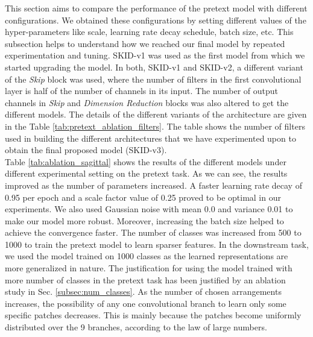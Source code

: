 \documentclass[journal]{IEEEtai}
\begin{document}
\indent This section aims to compare the performance of the pretext model with different configurations. We obtained these configurations by setting different values of the hyper-parameters like scale, learning rate decay schedule, batch size, etc. This subsection helps to understand how we reached our final model by repeated experimentation and tuning. SKID-v1 was used as the first model from which we started upgrading the model. In both, SKID-v1 and SKID-v2, a different variant of the \textit{Skip} block was used, where the number of filters in the first convolutional layer is half of the number of channels in its input. The number of output channels in \textit{Skip} and \textit{Dimension Reduction} blocks was also altered to get the different models. The details of the different variants of the architecture are given in the Table \ref{tab:pretext_ablation_filters}. The table shows the number of filters used in building the different architectures that we have experimented upon to obtain the final proposed model (SKID-v3).\\
\indent Table \ref{tab:ablation_sagittal} shows the results of the different models under different experimental setting on the pretext task. As we can see, the results improved as the number of parameters increased. A faster learning rate decay of 0.95 per epoch and a scale factor value of 0.25 proved to be optimal in our experiments. We also used Gaussian noise with mean 0.0 and variance 0.01 to make our model more robust. Moreover, increasing the batch size helped to achieve the convergence faster. The number of classes was increased from 500 to 1000 to train the pretext model to learn sparser features. In the downstream task, we used the model trained on 1000 classes as the learned representations are more generalized in nature. The justification for using the model trained with more number of classes in the pretext task has been justified by an ablation study in Sec. \ref{subsec:num_classes}. As the number of chosen arrangements increases, the possibility of any one convolutional branch to learn only some specific patches decreases. This is mainly because the patches become uniformly distributed over the 9 branches, according to the law of large numbers. 
\end{document}
